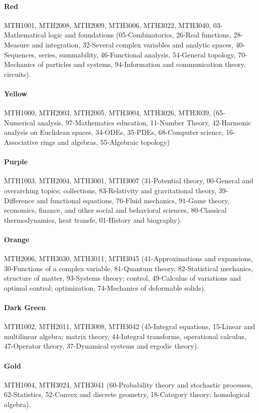 \documentclass[english, 12pt]{article}
\begin{document}
\paragraph{Red} MTH1001, MTH2008, MTH2009, MTH3006, MTH3022, MTH3040,  03-Mathematical logic and foundations (05-Combinatorics, 26-Real functions, 28- Measure and integration, 32-Several complex variables and analytic spaces, 40-Sequences, series, summability, 46-Functional analysis, 54-General topology, 70-Mechanics of particles and systems, 94-Information and communication theory, circuits).
\parskip=-16.0pt
\paragraph{Yellow} MTH1000, MTH2003, MTH2005, MTH3004, MTH3026, MTH3039, (65-Numerical analysis, 97-Mathematics education, 11-Number Theory, 42-Harmonic analysis on Euclidean spaces, 34-ODEs, 35-PDEs, 68-Computer science, 16-Associative rings and algebras, 55-Algebraic topology)
\paragraph{Purple} MTH1003, MTH2004, MTH3001, MTH3007 (31-Potential theory, 00-General and overarching topics; collections, 83-Relativity and gravitational theory, 39-Difference and functional equations, 76-Fluid mechanics, 91-Game theory, economics, finance, and other social and behavioral sciences, 80-Classical thermodynamics, heat transfe, 01-History and biography).
\paragraph{Orange} MTH2006, MTH3030, MTH3011, MTH3045 (41-Approximations and expansions, 30-Functions of a complex variable, 81-Quantum theory, 82-Statistical mechanics, structure of matter, 93-Systems theory; control, 49-Calculus of variations and optimal control; optimization, 74-Mechanics of deformable solids).
\paragraph{Dark Green} MTH1002, MTH2011, MTH3008, MTH3042 (45-Integral equations, 15-Linear and multilinear algebra; matrix theory, 44-Integral transforms, operational calculus, 47-Operator theory, 37-Dynamical systems and ergodic theory).
\paragraph{Gold} MTH1004, MTH3024, MTH3041 (60-Probability theory and stochastic processes, 62-Statistics, 52-Convex and discrete geometry, 18-Category theory; homological algebra).
\end{document}
